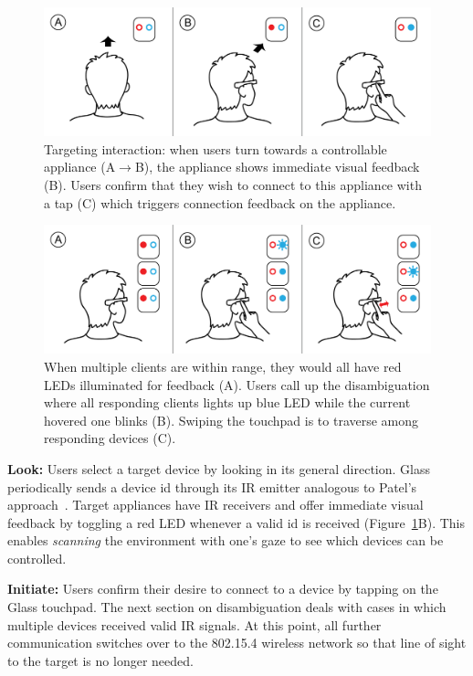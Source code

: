 \begin{figure}[t!]
\centering
\includegraphics[width=\columnwidth]{figures/stepbystep.png}
\caption{Targeting interaction: when users turn towards a controllable appliance (A$\rightarrow$B), the appliance shows immediate visual feedback (B). Users confirm that they wish to connect to this appliance with a tap (C) which triggers connection feedback on the appliance.}
\label{fig:interaction}
\end{figure}

\begin{figure}[t!]
\centering
\includegraphics[width=\columnwidth]{figures/stepbystep_multi.png}
\caption{When multiple clients are within range, they would all have red LEDs illuminated for feedback (A). Users call up the disambiguation where all responding clients lights up blue LED while the current hovered one blinks (B). Swiping the touchpad is to traverse among responding devices (C).}
\label{fig:interaction_multi}
\end{figure}

{\bf Look:} Users select a target device by looking in its general direction.
Glass periodically sends a device id through its IR emitter analogous to Patel's approach~\cite{patel_2-way_2003}. Target appliances have IR receivers and offer immediate visual feedback by toggling a red LED whenever a valid id is received (Figure~\ref{fig:interaction}B). This enables {\em scanning} the environment with one's gaze to see which devices can be controlled.

{\bf Initiate:} Users confirm their desire to connect to a device by tapping on the Glass touchpad. The next section on disambiguation deals with cases in which multiple devices received valid IR signals. At this point, all further communication switches over to the 802.15.4 wireless network so that line of sight to the target is no longer needed.


